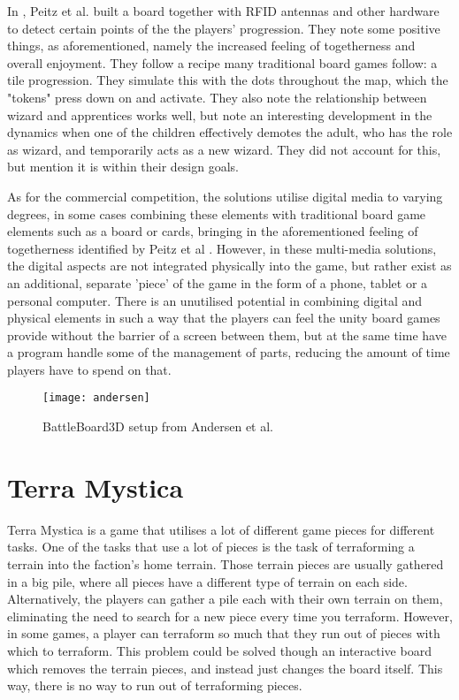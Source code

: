In \citep{peitzWizards2006}, Peitz et al. built a board together with RFID antennas and other hardware to detect certain points of the the players' progression. They note some positive things, as aforementioned, namely the increased feeling of togetherness and overall enjoyment. They follow a recipe many traditional board games follow: a tile progression. They simulate this with the dots throughout the map, which the "tokens" press down on and activate. They also note the relationship between wizard and apprentices works well, but note an interesting development in the dynamics when one of the children effectively demotes the adult, who has the role as wizard, and temporarily acts as a new wizard. They did not account for this, but mention it is within their design goals.

As for the commercial competition, the solutions utilise digital media to varying degrees, in some cases combining these elements with traditional board game elements such as a board or cards, bringing in the aforementioned feeling of togetherness identified by Peitz et al \citep{peitzWizards2006}. However, in these multi-media solutions, the digital aspects are not integrated physically into the game, but rather exist as an additional, separate 'piece' of the game in the form of a phone, tablet or a personal computer. There is an unutilised potential in combining digital and physical elements in such a way that the players can feel the unity board games provide without the barrier of a screen between them, but at the same time have a program handle some of the management of parts, reducing the amount of time players have to spend on that.

\begin{figure}[!h]
\centering	
\texttt{[image: andersen]}
\caption{BattleBoard3D setup from Andersen et al.  \citep{andersen_designing_2004}}
\label{fig:andersen}
\end{figure}


\section{Terra Mystica}
Terra Mystica is a game that utilises a lot of different game pieces for different tasks. One of the tasks that use a lot of pieces is the task of terraforming a terrain into the faction's home terrain. Those terrain pieces are usually gathered in a big pile, where all pieces have a different type of terrain on each side. Alternatively, the players can gather a pile each with their own terrain on them, eliminating the need to search for a new piece every time you terraform. However, in some games, a player can terraform so much that they run out of pieces with which to terraform. This problem could be solved though an interactive board which removes the terrain pieces, and instead just changes the board itself. This way, there is no way to run out of terraforming pieces.

